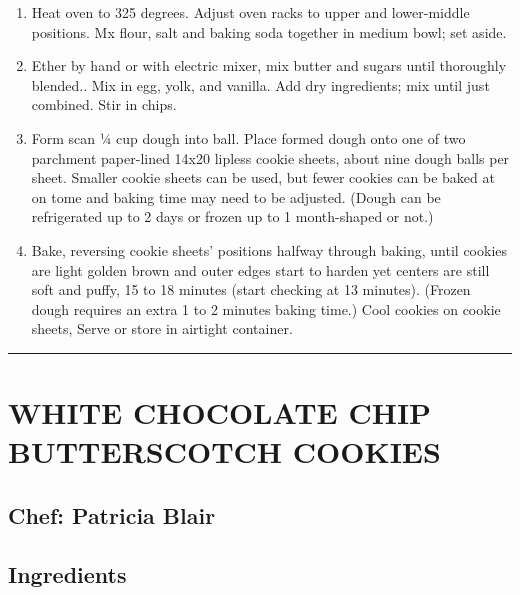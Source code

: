 \documentclass[
]{book}
\providecommand{\tightlist}{%
  \setlength{\itemsep}{0pt}\setlength{\parskip}{0pt}}
\begin{document}
\begin{enumerate}
\def\labelenumi{\arabic{enumi}.}
\tightlist
\item
  Heat oven to 325 degrees. Adjust oven racks to upper and lower-middle positions. Mx flour, salt and baking soda together in medium bowl; set aside.
\item
  Ether by hand or with electric mixer, mix butter and sugars until thoroughly blended.. Mix in egg, yolk, and vanilla. Add dry ingredients; mix until just combined. Stir in chips.
\item
  Form scan ¼ cup dough into ball. Place formed dough onto one of two parchment paper-lined 14x20 lipless cookie sheets, about nine dough balls per sheet. Smaller cookie sheets can be used, but fewer cookies can be baked at on tome and baking time may need to be adjusted. (Dough can be refrigerated up to 2 days or frozen up to 1 month-shaped or not.)
\item
  Bake, reversing cookie sheets' positions halfway through baking, until cookies are light golden brown and outer edges start to harden yet centers are still soft and puffy, 15 to 18 minutes (start checking at 13 minutes). (Frozen dough requires an extra 1 to 2 minutes baking time.) Cool cookies on cookie sheets, Serve or store in airtight container.
\end{enumerate}

\begin{center}\rule{0.5\linewidth}{0.5pt}\end{center}

\hypertarget{white-chocolate-chip-butterscotch-cookies}{%
\section*{WHITE CHOCOLATE CHIP BUTTERSCOTCH COOKIES}\label{white-chocolate-chip-butterscotch-cookies}}


\hypertarget{chef-patricia-blair-19}{%
\subsection*{Chef: Patricia Blair}\label{chef-patricia-blair-19}}


\hypertarget{ingredients-108}{%
\subsection*{Ingredients}\label{ingredients-108}}
\end{document}
